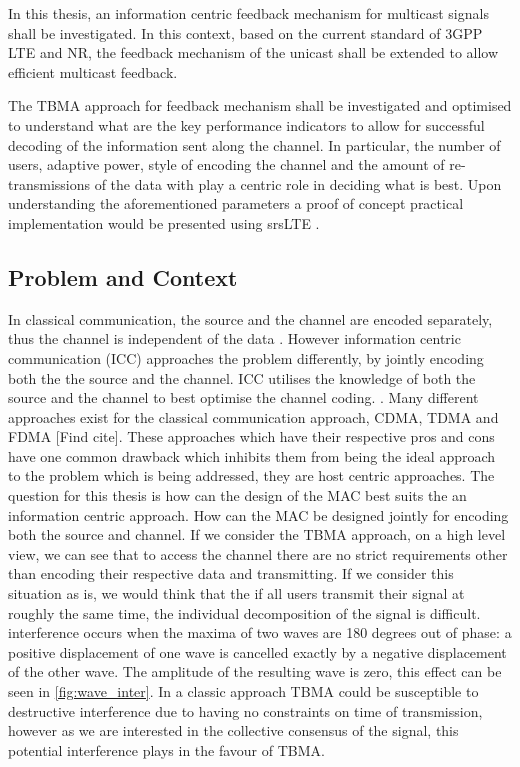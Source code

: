 \documentclass{article}
\begin{document}
In this thesis, an information centric feedback mechanism for multicast signals shall be investigated. In this context, based on the current standard of 3GPP LTE \cite{3gpp36321} and NR\cite{3gpp38321}, the feedback mechanism of the unicast shall be extended to allow efficient multicast feedback.

The TBMA approach for feedback mechanism shall be investigated and optimised to understand what are the key performance indicators to allow for successful decoding of the information sent along the channel. In particular, the number of users, adaptive power, style of encoding the channel and the amount of re-transmissions of the data with play a centric role in deciding what is best. Upon understanding the aforementioned parameters a proof of concept practical implementation would be presented using srsLTE \cite{tbma}. 


\subsection{Problem and Context}\label{prob_context}
In classical communication, the source and the channel are encoded separately, thus the channel is independent of the data \cite{shannon_theory}. However information centric communication (ICC) approaches the problem differently, by jointly encoding both the the source and the channel. ICC utilises the knowledge of both the source and the channel to best optimise the channel coding. \cite{information_centric}.
Many different approaches exist for the classical communication approach, CDMA, TDMA and FDMA [Find cite]. These approaches which have their respective pros and cons have one common drawback which inhibits them from being the ideal approach to the problem which is being addressed, they are host centric approaches. The question for this thesis is how can the design of the MAC best suits the an information centric approach. How can the MAC be designed jointly for encoding both the source and channel. 
If we consider the TBMA approach, on a high level view, we can see that to access the channel there are no strict requirements other than encoding their respective data and transmitting. If we consider this situation as is, we would think that the if all users transmit their signal at roughly the same time, the individual decomposition of the signal is difficult.   interference occurs when the maxima of two waves are 180 degrees out of phase: a positive displacement of one wave is cancelled exactly by a negative displacement of the other wave. The amplitude of the resulting wave is zero, this effect can be seen in \cref{fig:wave_inter}. In a classic approach TBMA could be susceptible to destructive interference due to having no constraints on time of transmission, however as we are interested in the collective consensus of the signal, this potential interference plays in the favour of TBMA. 
\end{document}
